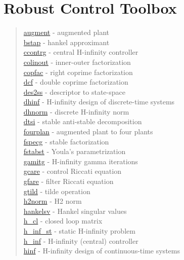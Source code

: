 \chapter*{Robust Control Toolbox}

\begin{quote}
\noindent
\hyperlink{augment}{augment} - {augmented plant} \\  
\hyperlink{bstap}{bstap} - {hankel approximant} \\  
\hyperlink{ccontrg}{ccontrg} - {central H-infinity controller} \\  
\hyperlink{colinout}{colinout} - {inner-outer factorization} \\  
\hyperlink{copfac}{copfac} - {right coprime factorization} \\  
\hyperlink{dcf}{dcf} - {double coprime factorization} \\  
\hyperlink{des2ss}{des2ss} - {descriptor to state-space} \\  
\hyperlink{dhinf}{dhinf} - {H-infinity design of discrete-time systems} \\
\hyperlink{dhnorm}{dhnorm} - {discrete H-infinity norm} \\  
\hyperlink{dtsi}{dtsi} - {stable anti-stable decomposition} \\  
\hyperlink{fourplan}{fourplan} - {augmented plant to four plants} \\  
\hyperlink{fspecg}{fspecg} - {stable factorization} \\  
\hyperlink{fstabst}{fstabst} - {Youla's parametrization} \\  
\hyperlink{gamitg}{gamitg} - {H-infinity gamma iterations} \\  
\hyperlink{gcare}{gcare} - {control Riccati equation} \\  
\hyperlink{gfare}{gfare} - {filter Riccati equation} \\  
\hyperlink{gtild}{gtild} - {tilde operation} \\  
\hyperlink{h2norm}{h2norm} - {H2 norm} \\  
\hyperlink{hankelsv}{hankelsv} - {Hankel singular values} \\  
\hyperlink{h_cl}{h\_cl}  - {closed loop matrix} \\  
\hyperlink{h_inf_st}{h\_inf\_st}  - {static H-infinity problem} \\  
\hyperlink{h_inf}{h\_inf}  - {H-infinity (central) controller} \\
\hyperlink{hinf}{hinf}  - {H-infinity design of continuous-time systems} \\

\end{quote}
